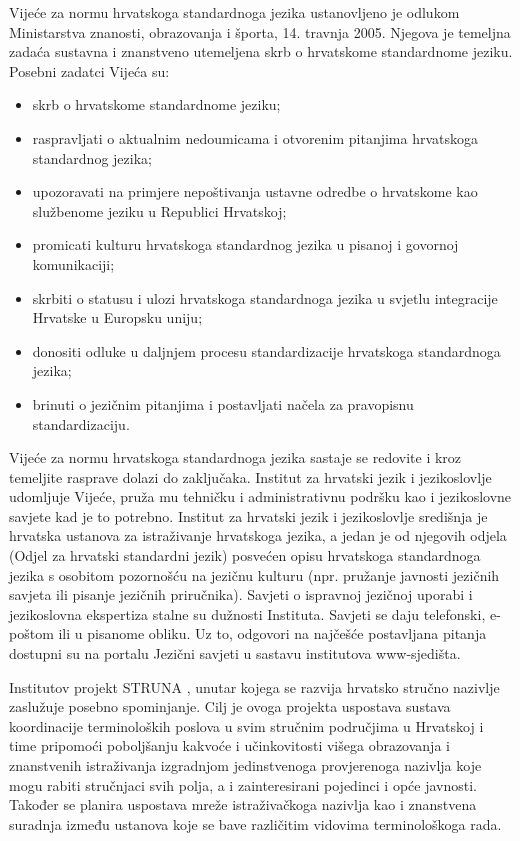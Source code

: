 \begin{multicols}{2}
Vijeće za normu hrvatskoga standardnoga jezika ustanovljeno je odlukom Ministarstva znanosti, obrazovanja i športa, 14. travnja 2005. Njegova je temeljna zadaća sustavna i znanstveno utemeljena skrb o hrvatskome standardnome jeziku. Posebni zadatci Vijeća su:

\begin{itemize}
\item skrb o hrvatskome standardnome jeziku;
\item raspravljati o aktualnim nedoumicama i otvorenim pitanjima hrvatskoga standardnog jezika;
\item upozoravati na primjere nepoštivanja ustavne odredbe o hrvatskome kao službenome jeziku u Republici Hrvatskoj;
\item promicati kulturu hrvatskoga standardnog jezika u pisanoj i govornoj komunikaciji;
\item skrbiti o statusu i ulozi hrvatskoga standardnoga jezika u svjetlu integracije Hrvatske u Europsku uniju;
\item donositi odluke u daljnjem procesu standardizacije hrvatskoga standardnoga jezika;
\item brinuti o jezičnim pitanjima i postavljati načela za pravopisnu standardizaciju.
\end{itemize}

Vijeće za normu hrvatskoga standardnoga jezika sastaje se redovite i kroz temeljite rasprave dolazi do zaključaka. Institut za hrvatski jezik i jezikoslovlje udomljuje Vijeće, pruža mu tehničku i administrativnu podršku kao i jezikoslovne savjete kad je to potrebno.
Institut za hrvatski jezik i jezikoslovlje \cite{str7} središnja je hrvatska ustanova za istraživanje hrvatskoga jezika, a jedan je od njegovih odjela (Odjel za hrvatski standardni jezik) posvećen opisu hrvatskoga standardnoga jezika s osobitom pozornošću na jezičnu kulturu (npr. pružanje javnosti jezičnih savjeta ili pisanje jezičnih priručnika). Savjeti o ispravnoj jezičnoj uporabi i jezikoslovna ekspertiza stalne su dužnosti Instituta. Savjeti se daju telefonski, e-poštom ili u pisanome obliku. Uz to, odgovori na najčešće postavljana pitanja dostupni su na portalu Jezični savjeti \cite{str8} u sastavu institutova www-sjedišta.


Institutov projekt STRUNA \cite{str9}, unutar kojega se razvija hrvatsko stručno nazivlje zaslužuje posebno spominjanje. Cilj je ovoga projekta uspostava sustava koordinacije terminoloških poslova u svim stručnim područjima u Hrvatskoj i time pripomoći poboljšanju kakvoće i učinkovitosti višega obrazovanja i znanstvenih istraživanja izgradnjom jedinstvenoga provjerenoga nazivlja koje mogu rabiti stručnjaci svih polja, a i zainteresirani pojedinci i opće javnosti. Također se planira uspostava mreže istraživačkoga nazivlja kao i znanstvena suradnja između ustanova koje se bave različitim vidovima terminološkoga rada.


\end{multicols}
